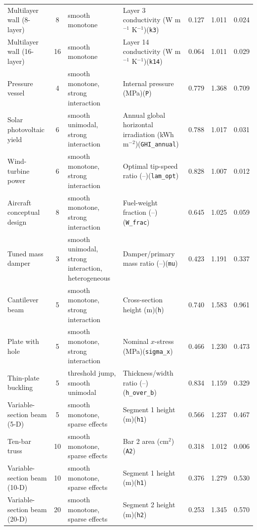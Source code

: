 \begin{longtable}{@{}>{\raggedright\arraybackslash}p{2.7cm}c>{\raggedright\arraybackslash}p{3.5cm}>{\raggedright\arraybackslash}p{3.9cm}rrr@{}}
Multilayer wall (8-layer) & 8 & smooth monotone & Layer 3 conductivity (W m$^{-1}$ K$^{-1}$)\newline (\texttt{k3}) & 0.127 & 1.011 & 0.024 \\
Multilayer wall (16-layer) & 16 & smooth monotone & Layer 14 conductivity (W m$^{-1}$ K$^{-1}$)\newline (\texttt{k14}) & 0.064 & 1.011 & 0.029 \\
Pressure vessel & 4 & smooth monotone, strong interaction & Internal pressure (MPa)\newline (\texttt{P}) & 0.779 & 1.368 & 0.709 \\
Solar photovoltaic yield & 6 & smooth unimodal, strong interaction & Annual global horizontal irradiation (kWh m$^{-2}$)\newline (\texttt{GHI\_annual}) & 0.788 & 1.017 & 0.031 \\
Wind-turbine power & 6 & smooth monotone, strong interaction & Optimal tip-speed ratio (--)\newline (\texttt{lam\_opt}) & 0.828 & 1.007 & 0.012 \\
Aircraft conceptual design & 8 & smooth monotone, strong interaction & Fuel-weight fraction (--)\newline (\texttt{W\_frac}) & 0.645 & 1.025 & 0.059 \\
Tuned mass damper & 3 & smooth unimodal, strong interaction, heterogeneous & Damper/primary mass ratio (--)\newline (\texttt{mu}) & 0.423 & 1.191 & 0.337 \\
Cantilever beam & 5 & smooth monotone, strong interaction & Cross-section height (m)\newline (\texttt{h}) & 0.740 & 1.583 & 0.961 \\
Plate with hole & 5 & smooth monotone, strong interaction & Nominal $x$-stress (MPa)\newline (\texttt{sigma\_x}) & 0.466 & 1.230 & 0.473 \\
Thin-plate buckling & 5 & threshold jump, smooth unimodal & Thickness/width ratio (--)\newline (\texttt{h\_over\_b}) & 0.834 & 1.159 & 0.329 \\
Variable-section beam (5-D) & 5 & smooth monotone, sparse effects & Segment 1 height (m)\newline (\texttt{h1}) & 0.566 & 1.237 & 0.467 \\
Ten-bar truss & 10 & smooth monotone, sparse effects & Bar 2 area (cm$^2$)\newline (\texttt{A2}) & 0.318 & 1.012 & 0.006 \\
Variable-section beam (10-D) & 10 & smooth monotone, sparse effects & Segment 1 height (m)\newline (\texttt{h1}) & 0.376 & 1.279 & 0.530 \\
Variable-section beam (20-D) & 20 & smooth monotone, sparse effects & Segment 2 height (m)\newline (\texttt{h2}) & 0.253 & 1.345 & 0.570 \\
\bottomrule
\end{longtable}
